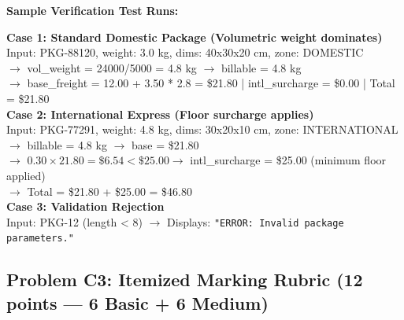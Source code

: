 \documentclass[11pt,a4paper]{article}
\begin{document}
\vspace{1.5mm}
\textbf{Sample Verification Test Runs:}
\begin{tcolorbox}[colback=CodeBg, colframe=primaryblue!35, arc=1.0mm, boxrule=0.5pt, left=2.0mm, right=2.0mm, top=1.0mm, bottom=1.0mm]
\scriptsize\ttfamily
\textbf{Case 1: Standard Domestic Package (Volumetric weight dominates)}\\
Input: PKG-88120, weight: 3.0 kg, dims: 40x30x20 cm, zone: DOMESTIC\\
$\rightarrow$ vol\_weight = 24000/5000 = 4.8 kg $\rightarrow$ billable = 4.8 kg\\
$\rightarrow$ base\_freight = 12.00 + 3.50 * 2.8 = \$21.80 | intl\_surcharge = \$0.00 | Total = \$21.80\\[1.5mm]
\textbf{Case 2: International Express (Floor surcharge applies)}\\
Input: PKG-77291, weight: 4.8 kg, dims: 30x20x10 cm, zone: INTERNATIONAL\\
$\rightarrow$ billable = 4.8 kg $\rightarrow$ base = \$21.80\\
$\rightarrow$ $0.30 \times 21.80 = \$6.54 < \$25.00 \rightarrow$ intl\_surcharge = \$25.00 (minimum floor applied)\\
$\rightarrow$ Total = \$21.80 + \$25.00 = \$46.80\\[1.5mm]
\textbf{Case 3: Validation Rejection}\\
Input: PKG-12 (length < 8) $\rightarrow$ Displays: \texttt{"ERROR: Invalid package parameters."}
\end{tcolorbox}

\newpage


\subsection*{Problem C3: Itemized Marking Rubric (12 points --- 6 Basic + 6 Medium)}
\end{document}
